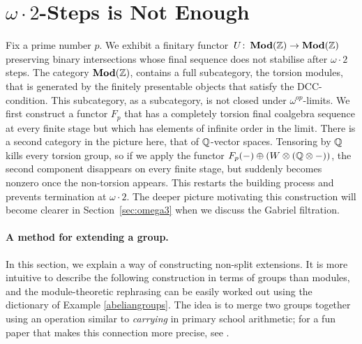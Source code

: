 \documentclass[runningheads]{llncs}
\begin{document}
\section{$\omega\cdot 2$-Steps is Not Enough}
\label{sec:counterexample}
Fix a prime number $p$. We exhibit a finitary functor~$U \colon\operatorname{\mathbf{Mod}}(\mathbb{Z})\to\operatorname{\mathbf{Mod}}(\mathbb{Z})$ preserving binary intersections whose final sequence does not stabilise after $\omega\cdot 2$ steps.  The category $\operatorname{\mathbf{Mod}}(\mathbb{Z})$, contains a full subcategory, the torsion modules, that is generated by the finitely presentable objects that satisfy the DCC-condition. This subcategory, as a subcategory, is not closed under $\omega^{op}$-limits. We first construct a functor $F_p$ that has a completely torsion final coalgebra sequence at every finite stage but which has elements of infinite order in the limit. There is a second category in the picture here, that of $\mathbb{Q}$-vector spaces. Tensoring by $\mathbb{Q}$ kills every torsion group, so if we apply the functor $F_p(-)\oplus (W \otimes (\mathbb{Q}\otimes -))$, the second component disappears on every finite stage, but suddenly becomes nonzero once the non-torsion appears. This restarts the building process and prevents termination at $\omega\cdot 2$. The deeper picture  motivating this construction will become clearer in Section~\ref{sec:omega3} when we discuss the Gabriel filtration.
 
 
 \paragraph*{A method for extending a group.}
 In this section, we explain a way of constructing non-split extensions. It is more intuitive to describe the following construction in terms of groups than modules, and the module-theoretic rephrasing can be easily worked out using the dictionary of Example \ref{abeliangroups}. The idea is to merge two groups together using an operation similar to \emph{carrying} in primary school arithmetic; for a fun paper that makes this connection more precise, see \cite{isaksen02}.
\end{document}
